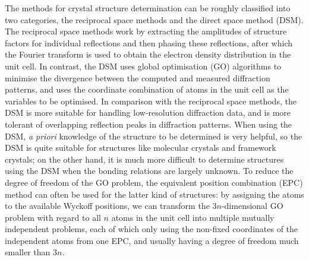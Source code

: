 \begin{eabstract}\raggedbottom
	The methods for crystal structure determination can be roughly classified
	into two categories, the reciprocal space methods and the direct space
	method (DSM).  The reciprocal space methods work by extracting the
	amplitudes of structure factors for individual reflections and then phasing
	these reflections, after which the Fourier transform is used to obtain
	the electron density distribution in the unit cell.  In contrast, the DSM
	uses global optimisation (GO) algorithms to minimise the divergence between
	the computed and measured diffraction patterns, and uses the coordinate
	combination of atoms in the unit cell as the variables to be optimised.
	In comparison with the reciprocal space methods, the DSM is more suitable
	for handling low-resolution diffraction data, and is more tolerant of
	overlapping reflection peaks in diffraction patterns.  When using the DSM,
	\emph{a priori} knowledge of the structure to be determined is very
	helpful, so the DSM is quite suitable for structures like molecular crystals
	and framework crystals; on the other hand, it is much more difficult
	to determine structures using the DSM when the bonding relations are
	largely unknown.  To reduce the degree of freedom of the GO problem, the
	equivalent position combination (EPC) method can often be used for the
	latter kind of structures: by assigning the atoms to the available Wyckoff
	positions, we can transform the $3n$-dimensional GO problem with regard to
	all $n$ atoms in the unit cell into multiple mutually independent problems,
	each of which only using the non-fixed coordinates of the independent atoms
	from one EPC, and usually having a degree of freedom much smaller than $3n$.


\end{eabstract}
